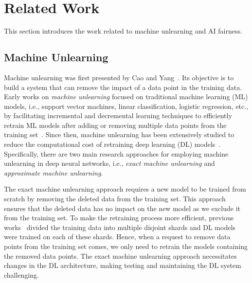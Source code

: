

\section{Related Work}
\label{sec:related_work}
This section introduces the work related to machine unlearning and AI fairness.

\subsection{Machine Unlearning}


Machine unlearning was first presented by Cao and Yang~\cite{towards-unlearning}. Its objective is to build a system that can remove the impact of a data point in the training data. Early works on \textit{machine unlearning} focused on traditional machine learning (ML) models, i.e., support vector machines, linear classification, logistic regression, etc., by facilitating incremental and decremental learning techniques to efficiently retrain ML models after adding or removing multiple data points from the training set~\cite{multi-incre-decre, regression-incre-decre, incre-decre-svm, incre-decre-linear}. Since then, machine unlearning has been extensively studied to reduce the computational cost of retraining deep learning (DL) models~\cite{towards-unlearning, baumhauer2022machine, sisa, golatkar2020forgetting, lifelong, amnesiac}. Specifically, there are two main research approaches for employing machine unlearning in deep neural networks, i.e., \textit{exact machine unlearning} and \textit{approximate machine unlearning}. 

The exact machine unlearning approach requires a new model to be trained from scratch by removing the deleted data from the training set. This approach ensures that the deleted data has no impact on the new model as we exclude it from the training set.
To make the retraining process more efficient, previous works~\cite{baumhauer2022machine, sisa} divided the training data into multiple disjoint shards and DL models were trained on each of these shards. Hence, when a request to remove data points from the training set comes, we only need to retrain the models containing the removed data points. The exact machine unlearning approach necessitates changes in the DL architecture, making testing and maintaining the DL system challenging. 


